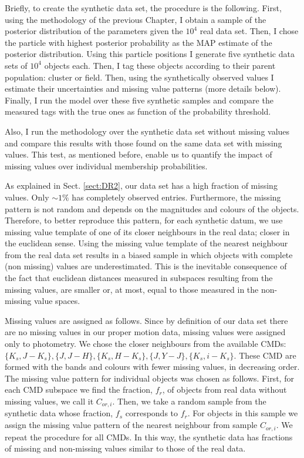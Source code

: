 Briefly, to create the synthetic data set, the procedure is the following. First, using the methodology of the previous Chapter, I obtain a sample of the posterior distribution of the parameters given the $10^4$ real data set. Then, I chose the particle with highest posterior probability as the MAP estimate of the posterior distribution. Using this particle positions I generate five synthetic data sets of $10^4$ objects each. Then, I tag these objects according to their parent population: cluster or field. Then, using the synthetically observed values I estimate their uncertainties and missing value patterns (more details  below). Finally, I run the model over these five synthetic samples and compare the measured tags with the true ones as function of the probability threshold.

 Also, I run the methodology over the synthetic data set without missing values and compare this results with those found on the same data set with missing values. This test, as mentioned before, enable us to quantify the impact of missing values over individual membership probabilities.  

As explained in Sect. \ref{sect:DR2}, our data set has a high fraction of missing values. Only $\sim1\%$ has completely observed entries. Furthermore, the missing pattern is not random and depends on the magnitudes and colours of the objects. Therefore, to better reproduce this pattern, for each synthetic datum, we use missing value template of one of its closer neighbours in the real data; closer in the euclidean sense. Using the missing value template of the nearest neighbour from the real data set results in a biased sample in which objects with complete (non missing) values are underestimated. This is the inevitable consequence of the fact that euclidean distances measured in subspaces resulting from the missing values, are smaller or, at most, equal to those measured in the non-missing value spaces. 

Missing values are assigned as follows. Since by definition of our data set there are no missing values in our proper motion data, missing values were assigned only to photometry. We chose the closer neighbours from the available CMDs: $\{K_s,J-K_s\},\{J,J-H\},\{K_s,H-K_s\},\{J,Y-J\},\{K_s,i-K_s\}$. These CMD are formed with the bands and colours with fewer missing values, in decreasing order.  The missing value pattern for individual objects was chosen as follows. First, for each CMD subspace we find the fraction, $f_r$, of objects from real data without missing values, we call it $C_{or,i}$. Then, we take a random sample from the synthetic data whose fraction, $f_s$ corresponds to $f_r$. For objects in this sample we assign the missing value pattern of the nearest neighbour from sample $C_{or,i}$. We repeat the procedure for all CMDs. In this way, the synthetic data has fractions of missing and non-missing values similar to those of the real data.

